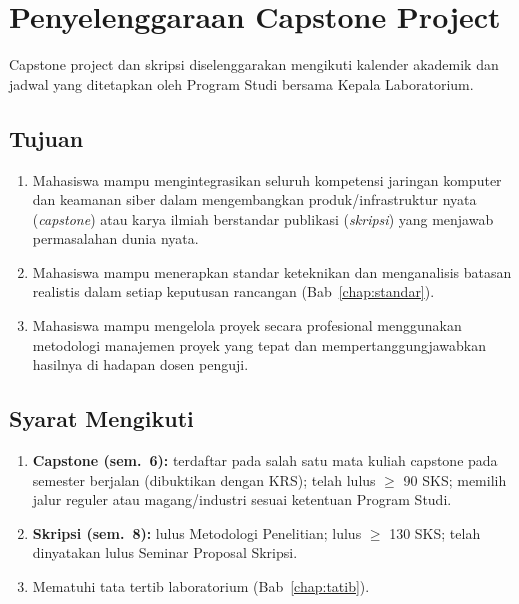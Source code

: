 \documentclass[12pt,a4paper]{report}
\begin{document}
\chapter{Penyelenggaraan Capstone Project}

Capstone project dan skripsi diselenggarakan mengikuti kalender akademik dan jadwal yang ditetapkan oleh Program Studi bersama Kepala Laboratorium.

\section{Tujuan}
\begin{enumerate}
\item Mahasiswa mampu mengintegrasikan seluruh kompetensi jaringan komputer dan keamanan siber dalam mengembangkan produk/infrastruktur nyata (\emph{capstone}) atau karya ilmiah berstandar publikasi (\emph{skripsi}) yang menjawab permasalahan dunia nyata.
\item Mahasiswa mampu menerapkan standar keteknikan dan menganalisis batasan realistis dalam setiap keputusan rancangan (Bab~\ref{chap:standar}).
\item Mahasiswa mampu mengelola proyek secara profesional menggunakan metodologi manajemen proyek yang tepat dan mempertanggungjawabkan hasilnya di hadapan dosen penguji.
\end{enumerate}

\section{Syarat Mengikuti}
\begin{enumerate}
\item \textbf{Capstone (sem.~6):} terdaftar pada salah satu mata kuliah capstone pada semester berjalan (dibuktikan dengan KRS); telah lulus $\geq$ 90 SKS; memilih jalur reguler atau magang/industri sesuai ketentuan Program Studi.
\item \textbf{Skripsi (sem.~8):} lulus Metodologi Penelitian; lulus $\geq$ 130 SKS; telah dinyatakan lulus Seminar Proposal Skripsi.
\item Mematuhi tata tertib laboratorium (Bab~\ref{chap:tatib}).
\end{enumerate}
\end{document}
